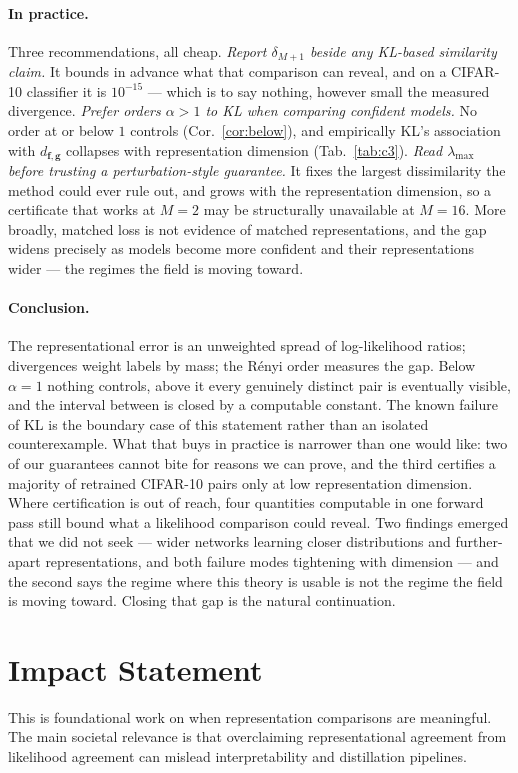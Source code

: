 \documentclass[10pt,letterpaper,twocolumn]{article}
\newcommand{\bff}{\mathbf{f}}
\newcommand{\bfg}{\mathbf{g}}
\newcommand{\dfg}{d_{\bff,\bfg}}
\theoremstyle{plain}
\theoremstyle{definition}
\theoremstyle{remark}
\begin{document}
\paragraph{In practice.}
Three recommendations, all cheap. \emph{Report $\delta_{M+1}$ beside any
KL-based similarity claim.} It bounds in advance what that comparison can
reveal, and on a CIFAR-10 classifier it is $10^{-15}$ --- which is to say
nothing, however small the measured divergence. \emph{Prefer orders
$\alpha>1$ to KL when comparing confident models.} No order at or below $1$
controls (Cor.~\ref{cor:below}), and empirically KL's association with $\dfg$
collapses with representation dimension (Tab.~\ref{tab:c3}). \emph{Read
$\lambda_{\max}$ before trusting a perturbation-style guarantee.} It fixes the
largest dissimilarity the method could ever rule out, and grows with the
representation dimension, so a certificate that works at $M=2$ may be
structurally unavailable at $M=16$. More broadly, matched loss is not evidence
of matched representations, and the gap widens precisely as models become more
confident and their representations wider --- the regimes the field is moving
toward.

\paragraph{Conclusion.}
The representational error is an unweighted spread of log-likelihood ratios;
divergences weight labels by mass; the R\'enyi order measures the gap. Below
$\alpha=1$ nothing controls, above it every genuinely distinct pair is
eventually visible, and the interval between is closed by a computable
constant. The known failure of KL is the boundary case of this statement rather
than an isolated counterexample. What that buys in practice is narrower than
one would like: two of our guarantees cannot bite for reasons we can prove, and
the third certifies a majority of retrained CIFAR-10 pairs only at low
representation dimension. Where certification is out of reach, four quantities
computable in one forward pass still bound what a likelihood comparison could
reveal. Two findings emerged that we did not seek --- wider networks learning
closer distributions and further-apart representations, and both failure modes
tightening with dimension --- and the second says the regime where this theory
is usable is not the regime the field is moving toward. Closing that gap is the
natural continuation.

\section*{Impact Statement}
This is foundational work on when representation comparisons are meaningful.
The main societal relevance is that overclaiming representational agreement
from likelihood agreement can mislead interpretability and distillation
pipelines.
\end{document}
